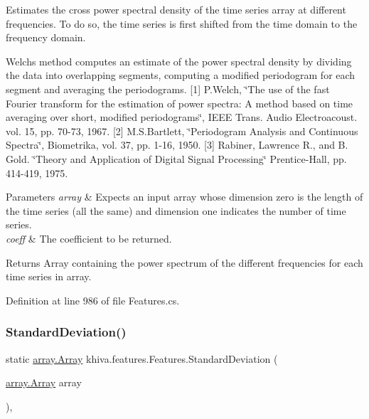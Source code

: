 Estimates the cross power spectral density of the time series array at different frequencies. To do so, the time series is first shifted from the time domain to the frequency domain. 

Welch\textquotesingle{}s method computes an estimate of the power spectral density by dividing the data into overlapping segments, computing a modified periodogram for each segment and averaging the periodograms. \mbox{[}1\mbox{]} P.\+Welch, \char`\"{}\+The use of the fast Fourier transform for the estimation of power spectra\+: A method based on time
 averaging over short, modified periodograms\char`\"{}, I\+E\+EE Trans. Audio Electroacoust. vol. 15, pp. 70-\/73, 1967. \mbox{[}2\mbox{]} M.\+S.\+Bartlett, \char`\"{}\+Periodogram Analysis and Continuous Spectra\char`\"{}, Biometrika, vol. 37, pp. 1-\/16, 1950. \mbox{[}3\mbox{]} Rabiner, Lawrence R., and B. Gold. \char`\"{}\+Theory and Application of Digital Signal Processing\char`\"{} Prentice-\/\+Hall, pp. 414-\/419, 1975. 


\begin{DoxyParams}{Parameters}
{\em array} & Expects an input array whose dimension zero is the length of the time series (all the same) and dimension one indicates the number of time series.\\
\hline
{\em coeff} & The coefficient to be returned.\\
\hline
\end{DoxyParams}
\begin{DoxyReturn}{Returns}
Array containing the power spectrum of the different frequencies for each time series in array.
\end{DoxyReturn}


Definition at line 986 of file Features.\+cs.

\mbox{\label{classkhiva_1_1features_1_1_features_afcda5621d1ba777b856df4784245c562}} 
\subsubsection{\texorpdfstring{Standard\+Deviation()}{StandardDeviation()}}
{\footnotesize\ttfamily static \mbox{\hyperlink{classkhiva_1_1array_1_1_array}{array.\+Array}} khiva.\+features.\+Features.\+Standard\+Deviation (\begin{DoxyParamCaption}\item[{\mbox{\hyperlink{classkhiva_1_1array_1_1_array}{array.\+Array}}}]{array }\end{DoxyParamCaption})\hspace{0.3cm}{\ttfamily [inline]}, {\ttfamily [static]}}



